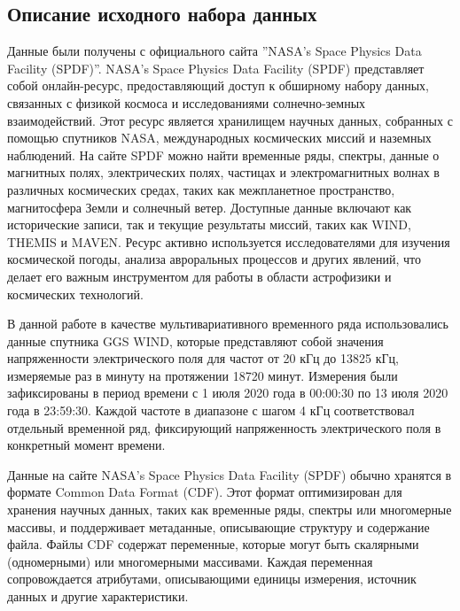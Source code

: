 \documentclass[spec, och, diploma]{SCWorks}
\begin{document}
    \subsection{Описание исходного набора данных}

        Данные были получены с официального сайта ''NASA's Space Physics Data
        Facility (SPDF)''. NASA's Space Physics Data Facility (SPDF)
        представляет собой онлайн-ресурс, предоставляющий доступ к обширному
        набору данных, связанных с физикой космоса и исследованиями
        солнечно-земных взаимодействий. Этот ресурс является хранилищем научных
        данных, собранных с помощью спутников NASA, международных космических
        миссий и наземных наблюдений. На сайте SPDF можно найти временные ряды,
        спектры, данные о магнитных полях, электрических полях, частицах и
        электромагнитных волнах в различных космических средах, таких как
        межпланетное пространство, магнитосфера Земли и солнечный ветер.
        Доступные данные включают как исторические записи, так и текущие
        результаты миссий, таких как WIND, THEMIS и MAVEN. Ресурс активно
        используется исследователями для изучения космической погоды, анализа
        авроральных процессов и других явлений, что делает его важным
        инструментом для работы в области астрофизики и космических технологий.
        \cite{space}

        В данной работе в качестве мультивариативного временного ряда
        использовались данные спутника GGS WIND, которые представляют собой
        значения напряженности электрического поля для частот от 20 кГц до 13825
        кГц, измеряемые раз в минуту на протяжении 18720 минут. Измерения были
        зафиксированы в период времени с 1 июля 2020 года в 00:00:30 по 13 июля
        2020 года в 23:59:30. Каждой частоте в диапазоне с шагом 4 кГц
        соответствовал отдельный временной ряд, фиксирующий напряженность
        электрического поля в конкретный момент времени.

        Данные на сайте NASA's Space Physics Data Facility (SPDF) обычно
        хранятся в формате Common Data Format (CDF). Этот формат оптимизирован
        для хранения научных данных, таких как временные ряды, спектры или
        многомерные массивы, и поддерживает метаданные, описывающие структуру и
        содержание файла. Файлы CDF содержат переменные, которые могут быть
        скалярными (одномерными) или многомерными массивами. Каждая переменная
        сопровождается атрибутами, описывающими единицы измерения, источник
        данных и другие характеристики.
\end{document}
